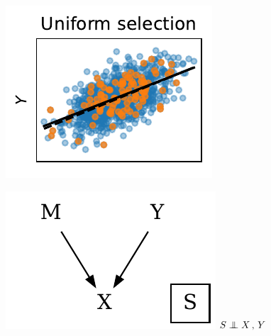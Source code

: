 \documentclass[twocolumn]{article}
\newcommand\indep{\protect\mathpalette{\protect\independenT}{\perp}}
\def\independenT#1#2{\mathrel{\rlap{$#1#2$}\mkern3.5mu{#1#2}}}
\begin{document}
%
\begin{figure}
  \begin{minipage}{.3\textwidth}
  \begin{minipage}{\textwidth}
  \begin{minipage}{.57\textwidth}
    \includegraphics[width=\textwidth]{selection_bias_1.pdf}
  \end{minipage}%
  \begin{minipage}{.42\textwidth}
    \includegraphics[width=\textwidth]{sample_selection_bias_1.pdf}
    \centering
    \(S \indep X\,,\,Y\)
  \end{minipage}%
  \end{minipage}%


\end{minipage}
\end{figure}
\end{document}
